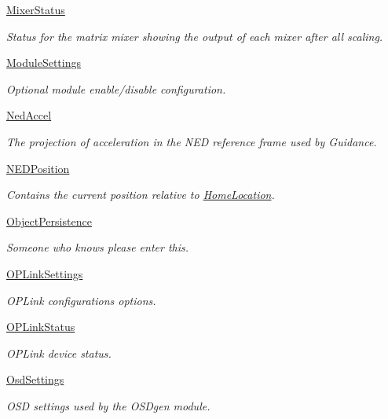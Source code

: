 \begin{DoxyCompactItemize}
\hyperlink{group___mixer_status}{\-Mixer\-Status}
\begin{DoxyCompactList}\small\item\em \-Status for the matrix mixer showing the output of each mixer after all scaling. \end{DoxyCompactList}\item 
\hyperlink{group___module_settings}{\-Module\-Settings}
\begin{DoxyCompactList}\small\item\em \-Optional module enable/disable configuration. \end{DoxyCompactList}\item 
\hyperlink{group___ned_accel}{\-Ned\-Accel}
\begin{DoxyCompactList}\small\item\em \-The projection of acceleration in the \-N\-E\-D reference frame used by \-Guidance. \end{DoxyCompactList}\item 
\hyperlink{group___n_e_d_position}{\-N\-E\-D\-Position}
\begin{DoxyCompactList}\small\item\em \-Contains the current position relative to \hyperlink{group___home_location}{\-Home\-Location}. \end{DoxyCompactList}\item 
\hyperlink{group___object_persistence}{\-Object\-Persistence}
\begin{DoxyCompactList}\small\item\em \-Someone who knows please enter this. \end{DoxyCompactList}\item 
\hyperlink{group___o_p_link_settings}{\-O\-P\-Link\-Settings}
\begin{DoxyCompactList}\small\item\em \-O\-P\-Link configurations options. \end{DoxyCompactList}\item 
\hyperlink{group___o_p_link_status}{\-O\-P\-Link\-Status}
\begin{DoxyCompactList}\small\item\em \-O\-P\-Link device status. \end{DoxyCompactList}\item 
\hyperlink{group___osd_settings}{\-Osd\-Settings}
\begin{DoxyCompactList}\small\item\em \-O\-S\-D settings used by the \-O\-S\-Dgen module. \end{DoxyCompactList}\item 

\end{DoxyCompactItemize}
